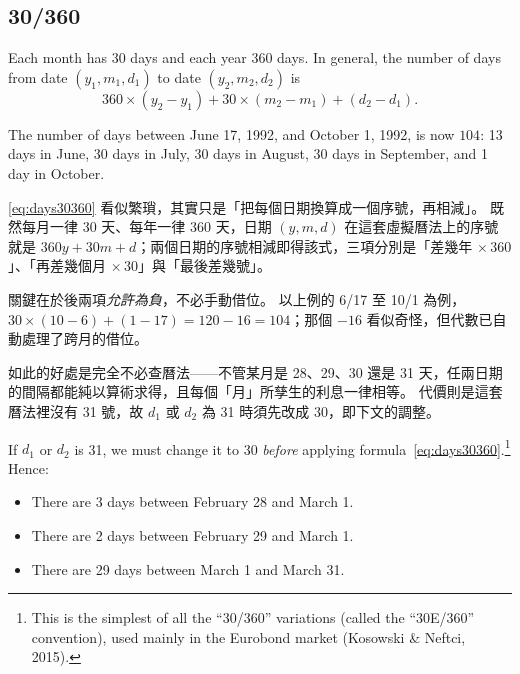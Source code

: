 \subsection{30/360}

Each month has 30 days and each year 360 days.
In general, the number of days from date $(y_{1}, m_{1}, d_{1})$ to date $(y_{2}, m_{2}, d_{2})$ is
\begin{equation}
	360 \times (y_{2}-y_{1}) + 30 \times (m_{2}-m_{1}) + (d_{2}-d_{1}) .
	\label{eq:days30360}
\end{equation}

\begin{eg}
	The number of days between June 17, 1992, and October 1, 1992, is now $104$: 13 days in June, 30 days in July, 30 days in August, 30 days in September, and 1 day in October.
\end{eg}

\suppstart
\begin{remark}
	\eqref{eq:days30360} 看似繁瑣，其實只是「把每個日期換算成一個序號，再相減」。
	既然每月一律 30 天、每年一律 360 天，日期 $(y, m, d)$ 在這套虛擬曆法上的序號就是 $360y + 30m + d$；兩個日期的序號相減即得該式，三項分別是「差幾年 $\times\, 360$」、「再差幾個月 $\times\, 30$」與「最後差幾號」。

	關鍵在於後兩項\emph{允許為負}，不必手動借位。
	以上例的 6/17 至 10/1 為例，$30 \times (10-6) + (1-17) = 120 - 16 = 104$；那個 $-16$ 看似奇怪，但代數已自動處理了跨月的借位。

	如此的好處是完全不必查曆法——不管某月是 28、29、30 還是 31 天，任兩日期的間隔都能純以算術求得，且每個「月」所孳生的利息一律相等。
	代價則是這套曆法裡沒有 31 號，故 $d_{1}$ 或 $d_{2}$ 為 31 時須先改成 30，即下文的調整。
\end{remark}
\suppend

If $d_{1}$ or $d_{2}$ is 31, we must change it to 30 \emph{before} applying formula~\eqref{eq:days30360}.\footnote{This is the simplest of all the ``30/360'' variations (called the ``30E/360'' convention), used mainly in the Eurobond market (Kosowski \& Neftci, 2015).} Hence:

\begin{itemize}[nosep]
	\item There are 3 days between February 28 and March 1.
	\item There are 2 days between February 29 and March 1.
	\item There are 29 days between March 1 and March 31.
\end{itemize}

